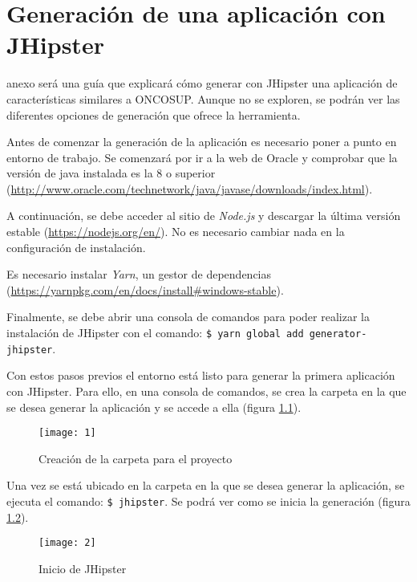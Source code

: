 \chapter{Generación de una aplicación con JHipster}
\label{anex:2}

 anexo será una guía que explicará cómo generar con JHipster una aplicación de características similares a ONCOSUP. Aunque no se exploren, se podrán ver las diferentes opciones de generación que ofrece la herramienta.

Antes de comenzar la generación de la aplicación es necesario poner a punto en entorno de trabajo. Se comenzará por ir a la web de Oracle y comprobar que la versión de java instalada es la 8 o superior (\url{http://www.oracle.com/technetwork/java/javase/downloads/index.html}).

A continuación, se debe acceder al sitio de \emph{Node.js} y descargar la última versión estable (\url{https://nodejs.org/en/}). No es necesario cambiar nada en la configuración de instalación.

Es necesario instalar \emph{Yarn}, un gestor de dependencias (\url{https://yarnpkg.com/en/docs/install#windows-stable}).

Finalmente, se debe abrir una consola de comandos para poder realizar la instalación de JHipster con el comando: \texttt{\$ yarn global add generator-jhipster}.

Con estos pasos previos el entorno está listo para generar la primera aplicación con JHipster. Para ello, en una consola de comandos, se crea la carpeta en la que se desea generar la aplicación y se accede a ella (figura \ref{fig:1}).

\begin{figure}[!h]
\begin{center}
\texttt{[image: 1]}
\caption{Creación de la carpeta para el proyecto}
\label{fig:1}
\end{center}
\end{figure} 
\clearpage
Una vez se está ubicado en la carpeta en la que se desea generar la aplicación, se ejecuta el comando: \texttt{\$ jhipster}. Se podrá ver como se inicia la generación (figura \ref{fig:2}).

\begin{figure}[!h]
\begin{center}
\texttt{[image: 2]}
\caption{Inicio de JHipster}
\label{fig:2}
\end{center}
\end{figure} 


